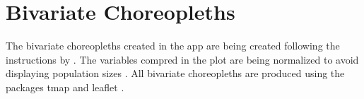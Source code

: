 \section{Bivariate Choreopleths}

The bivariate choreopleths created in the app are being created following the instructions by . The variables compred in the plot are being normalized to avoid displaying population sizes \cite{JoshuaStevens.2015}. All bivariate choreopleths are produced using the packages tmap \cite{Tennekes.2018} and leaflet \cite{Cheng.2018}. 
